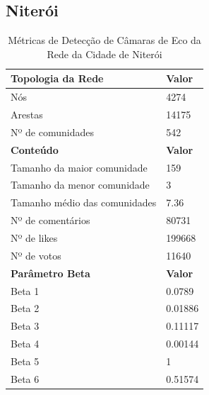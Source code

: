 \subsection{Niterói}

\begin{table}[ht]
	\centering
	\caption{Métricas de Detecção de Câmaras de Eco da Rede da Cidade de Niterói}
	\label{tab:echo-chamber-metrics-niteroi}
	\begin{tabular}{l|l}
		\toprule
		\textbf{Topologia da Rede}          & \textbf{Valor}                   \\
		\midrule
		Nós                                 & 4274                             \\
		Arestas                             & 14175                            \\
		Nº de comunidades                   & 542                              \\
		\toprule
		\textbf{Conteúdo}                   & \textbf{Valor}                   \\
		\midrule
		Tamanho da maior comunidade         & 159                              \\
		Tamanho da menor comunidade         & 3                                \\
		Tamanho médio das comunidades       & 7.36                             \\
		Nº de comentários                   & 80731                            \\
		Nº de likes                         & 199668                           \\
		Nº de votos                         & 11640                            \\
		\midrule
		\textbf{Parâmetro Beta}             & \textbf{Valor}                   \\
		\midrule
		Beta 1                              & 0.0789                           \\
		Beta 2                              & 0.01886                          \\
		Beta 3                              & 0.11117                          \\
		Beta 4                              & 0.00144                          \\
		Beta 5                              & 1                                \\
		Beta 6                              & 0.51574                          \\

\end{tabular}
\end{table}
